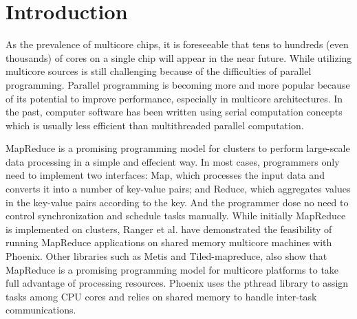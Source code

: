 \section{Introduction}
\label{sec:intro}



As the prevalence of multicore chips,
it is foreseeable
that tens to hundreds (even thousands) of cores on a single chip
will appear in the near future\cite{Borkar2007core}.
While utilizing multicore sources is still challenging
because of the difficulties of parallel programming.
Parallel programming is becoming more and more popular
because of its potential to improve performance, especially in
multicore architectures. In the past, computer software has
been written using serial computation concepts which is
usually less efficient than multithreaded parallel computation.

MapReduce\cite{dean2004mapreduce} 
is a promising programming model for clusters
to perform large-scale data processing
in a simple and effecient way.
In most cases, programmers only need to implement two interfaces:
Map, which processes the input data and converts it into a 
number of key-value pairs; 
and Reduce, which aggregates values in the
key-value pairs according to the key.
And the programmer dose no need to control synchronization 
and schedule tasks manually.
While initially MapReduce is implemented on clusters, Ranger
et al. have demonstrated the feasibility of running MapReduce
applications on shared memory multicore machines with 
Phoenix\cite{ranger2007phoenix}.
Other libraries such as Metis\cite{mao2010metis} 
and Tiled-mapreduce\cite{chen2010tiled},
also show that MapReduce is a promising programming model 
for multicore platforms to take full advantage of  
processing resources.
Phoenix uses the pthread library to assign tasks 
among CPU cores and relies on
shared memory to handle inter-task communications.

